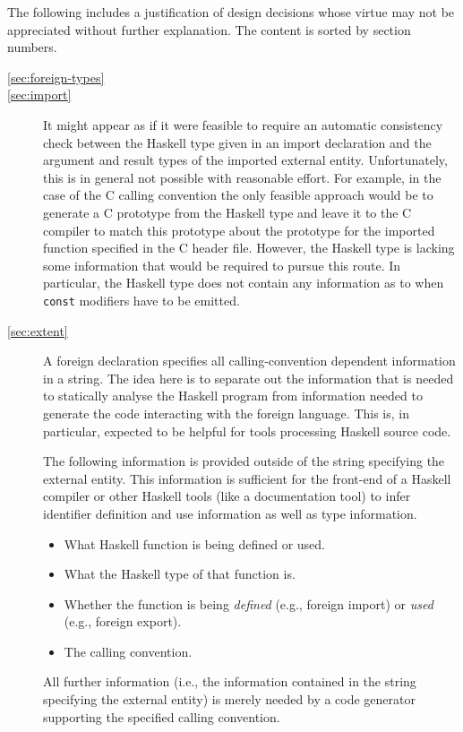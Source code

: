 \documentclass[a4paper,twosides]{article}
\newcommand{\code}[1]{\texttt{#1}}      %
\begin{document}
The following includes a justification of design decisions whose virtue may
not be appreciated without further explanation.  The content is sorted by
section numbers.
%
\begin{description}
\item[\ref{sec:foreign-types}] 
\item[\ref{sec:import}] It might appear as if it were feasible to
  require an automatic consistency check between the Haskell type given in an
  import declaration and the argument and result types of the imported
  external entity.  Unfortunately, this is in general not possible with
  reasonable effort.  For example, in the case of the C calling convention the
  only feasible approach would be to generate a C prototype from the Haskell
  type and leave it to the C compiler to match this prototype about the
  prototype for the imported function specified in the C header file.
  However, the Haskell type is lacking some information that would be required
  to pursue this route.  In particular, the Haskell type does not contain any
  information as to when \code{const} modifiers have to be emitted.
\item[\ref{sec:extent}] A foreign declaration specifies all calling-convention
  dependent information in a string.  The idea here is to separate out the
  information that is needed to statically analyse the Haskell program from
  information needed to generate the code interacting with the foreign
  language.  This is, in particular, expected to be helpful for tools
  processing Haskell source code.

  The following information is provided outside of the
  string specifying the external entity.  This information is sufficient for
  the front-end of a Haskell compiler or other Haskell tools (like a
  documentation tool) to infer identifier definition and use information as
  well as type information.
  \begin{itemize}
  \item What Haskell function is being defined or used.
  \item What the Haskell type of that function is.
  \item Whether the function is being \emph{defined} (e.g., foreign import) or
    \emph{used} (e.g., foreign export).
  \item The calling convention.
  \end{itemize}
  All further information (i.e., the information contained in the string
  specifying the external entity) is merely needed by a code generator
  supporting the specified calling convention.
  

\end{description}
\end{document}

